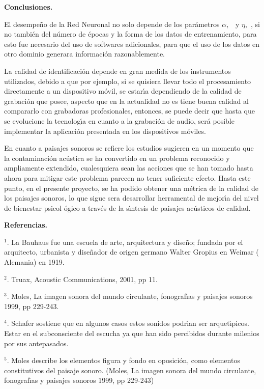 \textbf{Conclusiones.}

El desempe\~{n}o de la Red Neuronal no solo depende de los par\'{a}metros $%
\alpha ,$ \ y $\eta ,$ , si no tambi\'{e}n del n\'{u}mero de \'{e}pocas y la
forma de los datos de entrenamiento, para esto fue necesario del uso de
softwares adicionales, para que el uso de los datos en otro dominio generara
informaci\'{o}n razonablemente.

La calidad de identificaci\'{o}n depende en gran medida de los instrumentos
utilizados, debido a que por ejemplo, si se quisiera llevar todo el
procesamiento directamente a un dispositivo m\'{o}vil, se estar\'{\i}a
dependiendo de la calidad de grabaci\'{o}n que posee, aspecto que en la
actualidad no es tiene buena calidad al compararlo con grabadoras
profesionales, entonces, se puede decir que hasta que se evolucione la
tecnolog\'{\i}a en cuanto a la grabaci\'{o}n de audio, ser\'{a} posible
implementar la aplicaci\'{o}n presentada en los dispositivos m\'{o}viles.

En cuanto a paisajes sonoros se refiere los estudios sugieren en un momento
que la contaminaci\'{o}n ac\'{u}stica se ha convertido en un problema
reconocido y ampliamente extendido, cualesquiera sean las acciones que se
han tomado hasta ahora para mitigar este problema parecen no tener
suficiente efecto. Hasta este punto,  en el presente proyecto, se ha podido
obtener una m\'{e}trica de la calidad de los paisajes sonoros, lo que sigue
sera desarrollar herramental de mejor\'{\i}a del nivel de bienestar psicol%
\'{o}gico a trav\'{e}s de la s\'{\i}ntesis de paisajes ac\'{u}sticos de
calidad.

\textbf{Referencias.}

$^{1}$. La Bauhaus fue una escuela de arte, arquitectura y dise\~{n}o;
fundada por el arquitecto, urbanista y dise\~{n}ador de origen germano
Walter Gropius en Weimar ( Alemania) en 1919.

$^{2}$. Truax, Acoustic Communications, 2001, pp 11.

$^{3}$. Moles, La imagen sonora del mundo circulante, fonograf\'{\i}as y
paisajes sonoros 1999, pp 229-243.

$^{4}$. Schafer sostiene que en algunos casos estos sonidos podr\'{\i}an ser
arquet\'{\i}picos. Estar en el subconsciente del escucha ya que han sido
percibidos durante milenios por sus antepasados.

$^{5}$. Moles describe los elementos figura y fondo en oposici\'{o}n, como
elementos constitutivos del paisaje sonoro. (Moles, La imagen sonora del
mundo circulante, fonograf\'{\i}as y paisajes sonoros 1999, pp 229-243)

